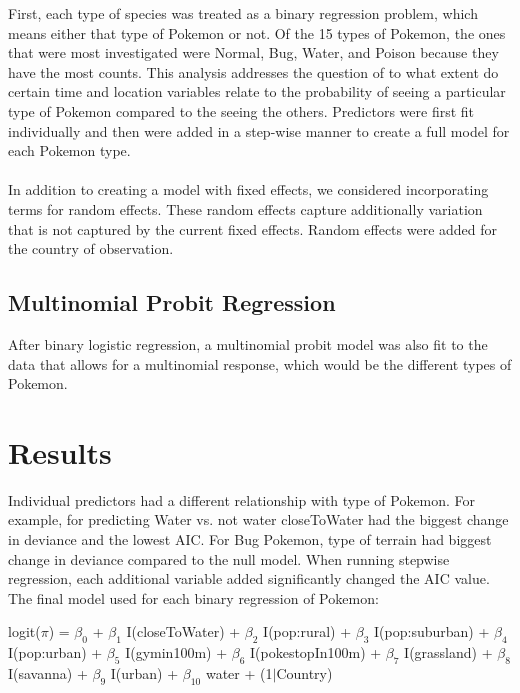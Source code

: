 \documentclass{article}
\begin{document}
First, each type of species was treated as a binary regression problem, which means either that type of Pokemon or not. Of the 15 types of Pokemon, the ones that were most investigated were Normal, Bug, Water, and Poison because they have the most counts. This analysis addresses the question of to what extent do certain time and location variables relate to the probability of seeing a particular type of Pokemon compared to the seeing the others. Predictors were first fit individually and then were added in a step-wise manner to create a full model for each Pokemon type. \\ 
\\ 
In addition to creating a model with fixed effects, we considered incorporating terms for random effects. These random effects capture additionally variation that is not captured by the current fixed effects. Random effects were added for the country of observation. 

\subsection{Multinomial Probit Regression}

After binary logistic regression, a multinomial probit model was also fit to the data that allows for a multinomial response, which would be the different types of Pokemon.

\section{Results}
Individual predictors had a different relationship with type of Pokemon. For example, for predicting Water vs. not water closeToWater had the biggest change in deviance and the lowest AIC. For Bug Pokemon, type of terrain had biggest change in deviance compared to the null model. When running stepwise regression, each additional variable added significantly changed the AIC value. The final model used for each binary regression of Pokemon:

\begin{center}
logit($\pi$) = $\beta_0$ + $\beta_1$ I(closeToWater) + $\beta_2$ I(pop:rural) + $\beta_3$ I(pop:suburban) + $\beta_4$ I(pop:urban) + $\beta_5$ I(gymin100m) + $\beta_6$ I(pokestopIn100m) + $\beta_7$ I(grassland) + $\beta_8$ I(savanna) + $\beta_9$ I(urban) + $\beta_{10}$ water + (1$|$Country)
\end{center}
\end{document}
